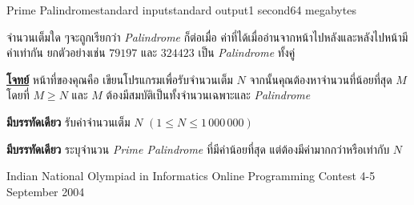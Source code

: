 \documentclass[11pt,a4paper]{article}
\begin{document}
\begin{problem}{Prime Palindrome}{standard input}{standard output}{1 second}{64 megabytes}

จำนวนเต็มใด ๆจะถูกเรียกว่า \textit{Palindrome} ก็ต่อเมื่อ ค่าที่ได้เมื่ออ่านจากหน้าไปหลังและหลังไปหน้ามีค่าเท่ากัน ยกตัวอย่างเช่น $79197$ และ $324423$ เป็น \textit{Palindrome} ทั้งคู่ 

\bigskip
\underline{\textbf{โจทย์}}  หน้าที่ของคุณคือ เขียนโปรแกรมเพื่อรับจำนวนเต็ม $N$ จากนั้นคุณต้องหาจำนวนที่น้อยที่สุด $M$ โดยที่ $M \geq N$ และ $M$ ต้องมีสมบัติเป็นทั้งจำนวนเฉพาะและ \textit{Palindrome}

\InputFile

\textbf{มีบรรทัดเดียว} รับค่าจำนวนเต็ม $N$ $(1 \leq N \leq 1\,000\,000)$ 

\OutputFile

\textbf{มีบรรทัดเดียว} ระบุจำนวน \textit{Prime Palindrome} ที่มีค่าน้อยที่สุด แต่ต้องมีค่ามากกว่าหรือเท่ากับ $N$

\Examples

\begin{example}
%
\end{example}


\Source

Indian National Olympiad in Informatics Online Programming Contest 4-5 September 2004

\end{problem}
\end{document}
